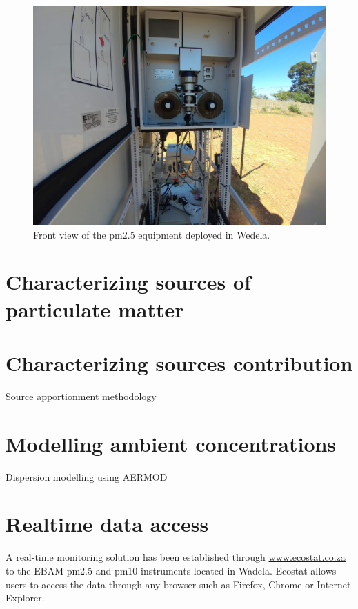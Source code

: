 \documentclass{nwureport}
\begin{document}
\begin{figure}[!htb]
    \centering
    \includegraphics[width=\textwidth]{images/wedela_6.jpeg}
    \caption[Front view of $PM_{2.5}$ equipment deployed in Wedela.]{Front view of the \gls{pm2.5} equipment deployed in Wedela.}
    \label{fig:wadela_instruments_pm2}
\end{figure}

\section{Characterizing sources of particulate matter}

\section{Characterizing sources contribution}

Source apportionment methodology

\section{Modelling ambient concentrations}

Dispersion modelling using AERMOD

\section{Realtime data access}

A real-time monitoring solution has been established through \url{www.ecostat.co.za} to
the EBAM \gls{pm2.5} and \gls{pm10} instruments located in Wadela. Ecostat allows users to access the data
through any browser such as Firefox, Chrome or Internet Explorer. 
\end{document}
